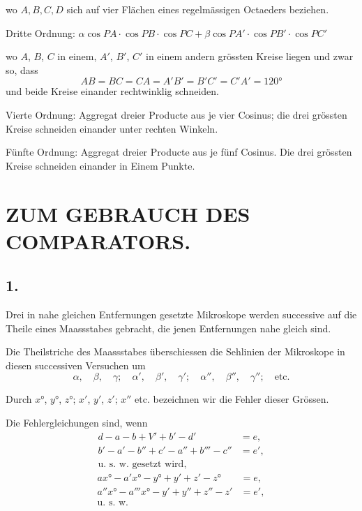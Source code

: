 \documentclass[fontsize=10pt,paper=a5,pagesize=auto]{scrbook}
\newcommand{\origpage}[1]{\marginpar{\footnotesize\textit{S. #1}}}
\begin{document}
wo $A, B, C, D$ sich auf vier Flächen eines regelmässigen Octaeders beziehen.

Dritte Ordnung: $\alpha \cos PA \cdot \cos PB \cdot \cos PC + \beta \cos PA' \cdot \cos PB' \cdot \cos PC'$

wo $A$, $B$, $C$ in einem, $A'$, $B'$, $C'$ in einem andern grössten Kreise liegen und zwar so, dass
\[
AB = BC = CA = A'B' = B'C' = C'A' = 120°
\]
und beide Kreise einander rechtwinklig schneiden.

Vierte Ordnung: Aggregat dreier Producte aus je vier Cosinus; die drei grössten Kreise schneiden einander unter rechten Winkeln.

Fünfte Ordnung: Aggregat dreier Producte aus je fünf Cosinus. Die drei grössten Kreise schneiden einander in Einem Punkte.

\newpage
\section*{ZUM GEBRAUCH DES COMPARATORS.}
\label{sec:comparator}

\subsection*{1.}
\origpage{638}
Drei in nahe gleichen Entfernungen gesetzte Mikroskope werden successive auf die Theile eines Maassstabes gebracht, die jenen Entfernungen nahe gleich sind.

Die Theilstriche des Maassstabes überschiessen die Sehlinien der Mikroskope in diesen successiven Versuchen um
\[
\alpha, \quad \beta, \quad \gamma; \quad \alpha', \quad \beta', \quad \gamma'; \quad \alpha'', \quad \beta'', \quad \gamma''; \quad \text{etc.}
\]

Durch $x°$, $y°$, $z°$; $x'$, $y'$, $z'$; $x''$ etc. bezeichnen wir die Fehler dieser Grössen.

Die Fehlergleichungen sind, wenn
\begin{align*}
d - a - b + V' + b' - d' &= e,\\
b' - a' - b'' + c' - a'' + b''' - c'' &= e',\\
\text{u.~s.~w. gesetzt wird,}&
\end{align*}
\begin{align*}
ax° - a'x° - y° + y' + z' - z° &= e,\\
a''x° - a'''x° - y' + y'' + z'' - z' &= e',\\
\text{u.~s.~w.}&
\end{align*}
\end{document}
